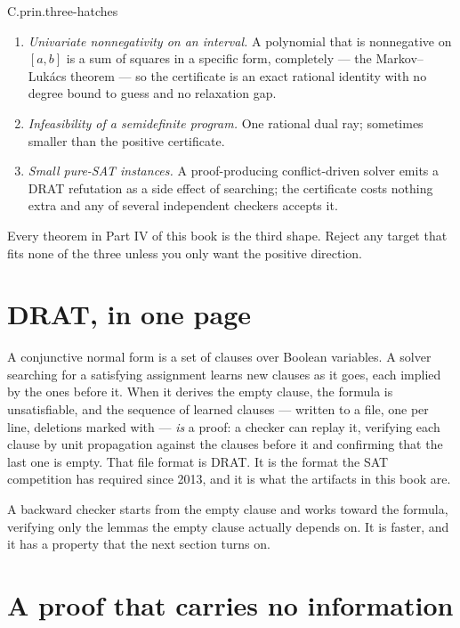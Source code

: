 \begin{artifact}{C.prin.three-hatches}
\begin{enumerate}
\item \emph{Univariate nonnegativity on an interval.} A polynomial that is nonnegative on \([a, b]\) is a sum of squares in a specific form, completely --- the Markov–Lukács theorem --- so the certificate is an exact rational identity with no degree bound to guess and no relaxation gap.
\item \emph{Infeasibility of a semidefinite program.} One rational dual ray; sometimes smaller than the positive certificate.
\item \emph{Small pure-SAT instances.} A proof-producing conflict-driven solver emits a DRAT refutation as a side effect of searching; the certificate costs nothing extra and any of several independent checkers accepts it.
\end{enumerate}
Every theorem in Part IV of this book is the third shape. Reject any target that fits none of the three unless you only want the positive direction.
\end{artifact}

\section{DRAT, in one page}
\label{sec:drat}

A conjunctive normal form is a set of clauses over Boolean variables. A solver searching for a satisfying assignment learns new clauses as it goes, each implied by the ones before it. When it derives the empty clause, the formula is unsatisfiable, and the sequence of learned clauses --- written to a file, one per line, deletions marked with  --- \emph{is} a proof: a checker can replay it, verifying each clause by unit propagation against the clauses before it and confirming that the last one is empty. That file format is DRAT. It is the format the SAT competition has required since 2013, and it is what the artifacts in this book are.

A backward checker starts from the empty clause and works toward the formula, verifying only the lemmas the empty clause actually depends on. It is faster, and it has a property that the next section turns on.

\section{A proof that carries no information}
\label{sec:vacuous}

